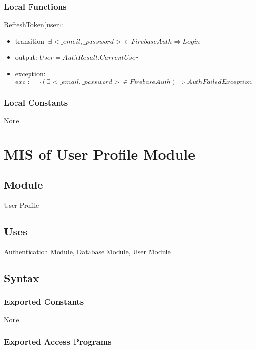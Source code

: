 \documentclass[12pt, titlepage]{article}
\begin{document}
\subsubsection{Local Functions}

\noindent RefreshToken(user):
\begin{itemize}
\item transition: $\exists <\_email, \_password> \in FirebaseAuth \Rightarrow Login$
\item output: $User = AuthResult.CurrentUser$
\item exception: $exc:= \lnot(\exists <\_email, \_password> \in FirebaseAuth) \Rightarrow AuthFailedException$
\end{itemize}

\subsubsection{Local Constants}

None

\newpage

\section{MIS of User Profile Module} \label{mUP}

\subsection{Module}

User Profile

\subsection{Uses}

Authentication Module, Database Module, User Module

\subsection{Syntax}

\subsubsection{Exported Constants}

None

\subsubsection{Exported Access Programs}
\end{document}
